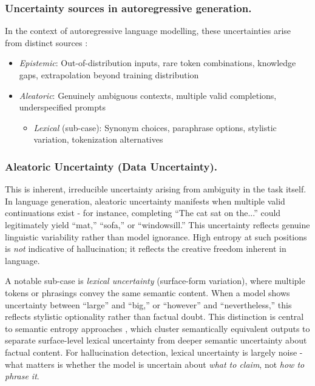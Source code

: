 \subsubsection{Uncertainty sources in autoregressive generation.} In the context of autoregressive language modelling, these uncertainties arise from distinct sources \citep{malinin2021uncertainty}:
\begin{itemize}[noitemsep]
    \item \textit{Epistemic}: Out-of-distribution inputs, rare token combinations, knowledge gaps, extrapolation beyond training distribution
    \item \textit{Aleatoric}: Genuinely ambiguous contexts, multiple valid completions, underspecified prompts
    \begin{itemize}[noitemsep]
        \item \textit{Lexical} (sub-case): Synonym choices, paraphrase options, stylistic variation, tokenization alternatives
    \end{itemize}
\end{itemize}

\subsubsection{Aleatoric Uncertainty (Data Uncertainty).} This is inherent, irreducible uncertainty arising from ambiguity in the task itself. In language generation, aleatoric uncertainty manifests when multiple valid continuations exist - for instance, completing ``The cat sat on the...'' could legitimately yield ``mat,'' ``sofa,'' or ``windowsill.'' This uncertainty reflects genuine linguistic variability rather than model ignorance. High entropy at such positions is \textit{not} indicative of hallucination; it reflects the creative freedom inherent in language.

A notable sub-case is \textit{lexical uncertainty} (surface-form variation), where multiple tokens or phrasings convey the same semantic content. When a model shows uncertainty between ``large'' and ``big,'' or ``however'' and ``nevertheless,'' this reflects stylistic optionality rather than factual doubt. This distinction is central to semantic entropy approaches \citep{farquhar2024detecting}, which cluster semantically equivalent outputs to separate surface-level lexical uncertainty from deeper semantic uncertainty about factual content. For hallucination detection, lexical uncertainty is largely noise - what matters is whether the model is uncertain about \textit{what to claim}, not \textit{how to phrase it}.

